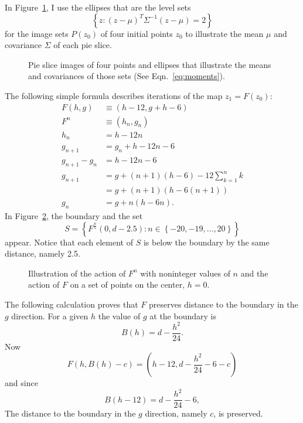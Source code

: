 \documentclass[twocolumn]{article}
\begin{document}
In Figure~\ref{fig:eric}, I use the ellipses that are the level sets
\begin{equation}
  \label{eq:moments}
  \left\{ z : (z-\mu)^T \Sigma^{-1} (z-\mu) = 2 \right\}
\end{equation}
for the image sets $P(z_0)$ of four initial points $z_0$ to illustrate
the mean $\mu$ and covariance $\Sigma$ of each pie slice.

\begin{figure}
  \centering
    \caption{Pie slice images of four points and ellipses that
      illustrate the means and covariances of those sets (See
      Eqn.~\eqref{eq:moments}).}
  \label{fig:eric}
\end{figure}

The following simple formula describes iterations of the map $z_1 =
F(z_0)$:
\begin{align*}
  F(h,g) &\equiv (h-12, g + h -6) \\
  F^n &\equiv (h_n, g_n) \\
  h_n &= h - 12 n \\
  g_{n+1} &= g_n + h - 12 n -6 \\
  g_{n+1} - g_n &= h - 12 n -6 \\
  g_{n+1} &= g + (n+1) (h-6) - 12\sum_{k=1}^n k \\
  &= g + (n+1)(h - 6(n+1)) \\
  g_n &= g + n(h - 6 n).
\end{align*}
In Figure~\ref{fig:f_n}, the boundary and the set
\begin{equation*}
S = \left\{ F^{\frac{n}{5}} (0,d-2.5) : n
    \in \left\{ -20, -19, \ldots , 20 \right\} \right\}  
\end{equation*}
appear.  Notice that each element of $S$ is below the boundary by the
same distance, namely 2.5.
\begin{figure}
  \centering
    \caption{Illustration of the action of $F^n$ with noninteger
      values of $n$ and the action of $F$ on a set of points on the
      center, $h=0$.}
  \label{fig:f_n}
\end{figure}

The following calculation proves that $F$ preserves distance to the
boundary in the $g$ direction.  For a given $h$ the value of $g$ at
the boundary is
\begin{equation*}
  B(h) = d - \frac{h^2}{24}.
\end{equation*}
Now
\begin{equation*}
  F(h,B(h)-c) = \left( h-12, d - \frac{h^2}{24} - 6 -c \right)
\end{equation*}
and since
\begin{equation*}
  B(h-12) = d - \frac{h^2}{24} - 6,
\end{equation*}
The distance to the boundary in the $g$ direction, namely $c$, is
preserved.
\end{document}
